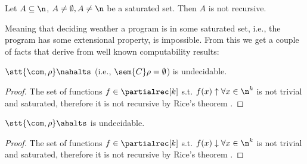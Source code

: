 \begin{theorem}
  Let \(A\subseteq \n\), \(A\neq \emptyset, A \neq \n\) be a saturated
  set. Then \(A\) is not recursive.
\end{theorem}

Meaning that deciding weather a program is in some saturated set, i.e.,
the program has some extensional property, is impossible.  From this
we get a couple of facts that derive from well known computability
results:

\begin{corollary}
  \(\stt{\com, \rho} \nahalts\) (i.e., \(\sem{C}\rho = \emptyset\)) is
  undecidable.
\end{corollary}

\begin{proof}
  The set of functions \(f\in \partialrec[k]\) s.t.
  \(f(x) \uparrow \forall x \in \n^k\) is not trivial and saturated,
  therefore it is not recursive by Rice's theorem
  \cite{rice1953classes}.
\end{proof}

\begin{corollary}
  \(\stt{\com, \rho} \ahalts\) is undecidable.
\end{corollary}
\begin{proof}
  The set of functions \(f\in \partialrec[k]\) s.t.
  \(f(x) \downarrow \forall x \in \n^k\) is not trivial and saturated,
  therefore it is not recursive by Rice's theorem
  \cite{rice1953classes}.
\end{proof}
